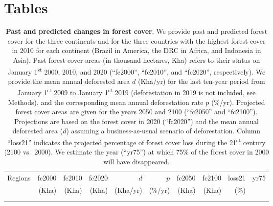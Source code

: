 \documentclass[
  12pt,
]{article}
\begin{document}
\newpage

\hypertarget{tables}{%
\section*{Tables}\label{tables}}



\begin{table}[H]

\caption{\label{tab:fcc}\textbf{Past and predicted changes in forest cover}. We provide past and predicted forest cover for the three continents and for the three countries with the highest forest cover in 2010 for each continent (Brazil in America, the DRC in Africa, and Indonesia in Asia). Past forest cover areas (in thousand hectares, Kha) refers to their status on January 1\textsuperscript{st} 2000, 2010, and 2020 (``fc2000'', ``fc2010'', and ``fc2020'', respectively). We provide the mean annual deforested area \(d\) (Kha/yr) for the last ten-year period from January 1\textsuperscript{st} 2009 to January 1\textsuperscript{st} 2019 (deforestation in 2019 is not included, see Methods), and the corresponding mean annual deforestation rate \(p\) (\%/yr). Projected forest cover areas are given for the years 2050 and 2100 (``fc2050'' and ``fc2100''). Projections are based on the forest cover in 2020 (``fc2020'') and the mean annual deforested area (\(d\)) assuming a business-as-usual scenario of deforestation. Column ``loss21'' indicates the projected percentage of forest cover loss during the 21\textsuperscript{st} century (2100 vs.~2000). We estimate the year (``yr75'') at which 75\% of the forest cover in 2000 will have disappeared.\vspace{0.5cm}}
\centering
\fontsize{10}{12}\selectfont
\begin{tabular}[t]{lrrrrrrrrr}
\toprule
\multicolumn{1}{l}{Regions} & \multicolumn{1}{r}{fc2000} & \multicolumn{1}{r}{fc2010} & \multicolumn{1}{r}{fc2020} & \multicolumn{1}{r}{$d$} & \multicolumn{1}{r}{$p$} & \multicolumn{1}{r}{fc2050} & \multicolumn{1}{r}{fc2100} & \multicolumn{1}{r}{loss21} & \multicolumn{1}{r}{yr75} \\
 & (Kha) & (Kha) & (Kha) & (Kha/yr) & (\%/yr) & (Kha) & (Kha) & (\%) & \\
\midrule
\addlinespace[0.3em]
\multicolumn{10}{l}{\textbf{Countries}}\\
\cellcolor{gray!6}{\hspace{1em}Brazil} & \cellcolor{gray!6}{375,893} & \cellcolor{gray!6}{349,784} & \cellcolor{gray!6}{334,982} & \cellcolor{gray!6}{1,537} & \cellcolor{gray!6}{0.4} & \cellcolor{gray!6}{288,862} & \cellcolor{gray!6}{211,996} & \cellcolor{gray!6}{44} & \cellcolor{gray!6}{2183}\\

\end{tabular}
\end{table}
\end{document}
